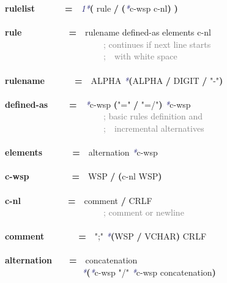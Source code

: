 \documentclass{article}
\begin{document}
{\footnotesize\ttfamily
\textbf{rulelist}\mbox{~~~~~~~}\textbf{=}\mbox{~~}\textcolor{MidnightBlue}{\emph{1*}}\textbf{(} rule \textbf{/} \textbf{(}\textcolor{MidnightBlue}{\emph{*}}c-wsp c-nl\textbf{)} \textbf{)}\\
\\
\textbf{rule}\mbox{~~~~~~~~~~~}\textbf{=}\mbox{~~}rulename defined-as elements c-nl\\
\mbox{~~~~~~~~~~~~~~~~~~~~~~~}\textcolor{Gray}{; continues if next line starts}\\
\mbox{~~~~~~~~~~~~~~~~~~~~~~~}\textcolor{Gray}{;\mbox{~~}with white space}\\
\\
\textbf{rulename}\mbox{~~~~~~~}\textbf{=}\mbox{~~}ALPHA \textcolor{MidnightBlue}{\emph{*}}\textbf{(}ALPHA \textbf{/} DIGIT \textbf{/} \textcolor{BrickRed}{"-"}\textbf{)}\\
\\
\textbf{defined-as}\mbox{~~~~~}\textbf{=}\mbox{~~}\textcolor{MidnightBlue}{\emph{*}}c-wsp \textbf{(}\textcolor{BrickRed}{"="} \textbf{/} \textcolor{BrickRed}{"=/"}\textbf{)} \textcolor{MidnightBlue}{\emph{*}}c-wsp\\
\mbox{~~~~~~~~~~~~~~~~~~~~~~~}\textcolor{Gray}{; basic rules definition and}\\
\mbox{~~~~~~~~~~~~~~~~~~~~~~~}\textcolor{Gray}{;\mbox{~~}incremental alternatives}\\
\\
\textbf{elements}\mbox{~~~~~~~}\textbf{=}\mbox{~~}alternation \textcolor{MidnightBlue}{\emph{*}}c-wsp\\
\\
\textbf{c-wsp}\mbox{~~~~~~~~~~}\textbf{=}\mbox{~~}WSP \textbf{/} \textbf{(}c-nl WSP\textbf{)}\\
\\
\textbf{c-nl}\mbox{~~~~~~~~~~~}\textbf{=}\mbox{~~}comment \textbf{/} CRLF\\
\mbox{~~~~~~~~~~~~~~~~~~~~~~~}\textcolor{Gray}{; comment or newline}\\
\\
\textbf{comment}\mbox{~~~~~~~~}\textbf{=}\mbox{~~}\textcolor{BrickRed}{";"} \textcolor{MidnightBlue}{\emph{*}}\textbf{(}WSP \textbf{/} VCHAR\textbf{)} CRLF\\
\\
\textbf{alternation}\mbox{~~~~}\textbf{=}\mbox{~~}concatenation\\
\mbox{~~~~~~~~~~~~~~~~~~}\textcolor{MidnightBlue}{\emph{*}}\textbf{(}\textcolor{MidnightBlue}{\emph{*}}c-wsp \textcolor{BrickRed}{"/"} \textcolor{MidnightBlue}{\emph{*}}c-wsp concatenation\textbf{)}\\
}
\end{document}
